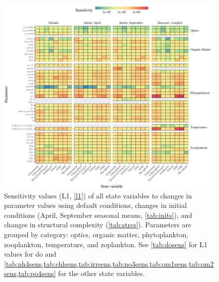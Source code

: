 \documentclass[letterpaper,12pt,oneside]{article}\usepackage[]{graphicx}\usepackage[]{color}
\begin{document}
\begin{figure}[!ht]

{\centering \includegraphics[width=\textwidth]{figs/sensalltile-1} 

}

\caption{Sensitivity values (L1, \cref{l1}) of all state variables to changes in parameter values using default conditions, changes in initial conditions (April, September seasonal means, \cref{tab:inits}), and changes in structural complexity (\cref{tab:strcs}). Parameters are grouped by category: optics, organic matter, phytoplankton, zooplankton, temperature, and zoplankton.  See \cref{tab:dosens} for L1 values for \ac{do} and \cref{tab:nh4sens,tab:chlsens,tab:irrsens,tab:no3sens,tab:om1sens,tab:om2sens,tab:po4sens} for the other state variables.}\label{fig:sensalltile}
\end{figure}
\end{document}

